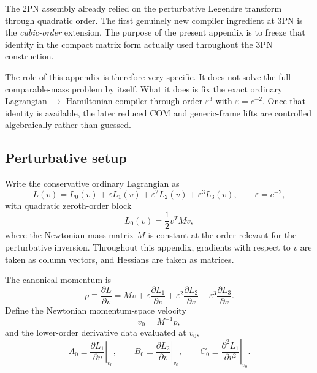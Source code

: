 \documentclass[11pt]{article}
\begin{document}
The $2$PN assembly already relied on the perturbative Legendre transform through
quadratic order.  The first genuinely new compiler ingredient at $3$PN is the
\emph{cubic-order} extension.  The purpose of the present appendix is to freeze
that identity in the compact matrix form actually used throughout the $3$PN
construction.

The role of this appendix is therefore very specific.  It does not solve the
full comparable-mass problem by itself.  What it does is fix the exact ordinary
Lagrangian $\to$ Hamiltonian compiler through order $\varepsilon^3$ with
\(\varepsilon=c^{-2}\).  Once that identity is available, the later reduced COM
and generic-frame lifts are controlled algebraically rather than guessed.

\subsection{Perturbative setup}
\label{app:cubic-legendre-setup}

Write the conservative ordinary Lagrangian as
\begin{equation}
L(v)=L_0(v)+\varepsilon L_1(v)+\varepsilon^2L_2(v)+\varepsilon^3L_3(v),
\qquad
\varepsilon=c^{-2},
\label{eq:app-cubic-legendre-L-expansion}
\end{equation}
with quadratic zeroth-order block
\begin{equation}
L_0(v)=\frac12 v^T M v,
\label{eq:app-cubic-legendre-L0}
\end{equation}
where the Newtonian mass matrix \(M\) is constant at the order relevant for the
perturbative inversion.  Throughout this appendix, gradients with respect to
\(v\) are taken as column vectors, and Hessians are taken as matrices.

The canonical momentum is
\begin{equation}
p\equiv \frac{\partial L}{\partial v}
= Mv
+\varepsilon\frac{\partial L_1}{\partial v}
+\varepsilon^2\frac{\partial L_2}{\partial v}
+\varepsilon^3\frac{\partial L_3}{\partial v}.
\label{eq:app-cubic-legendre-momentum}
\end{equation}
Define the Newtonian momentum-space velocity
\begin{equation}
v_0=M^{-1}p,
\label{eq:app-cubic-legendre-v0}
\end{equation}
and the lower-order derivative data evaluated at \(v_0\),
\begin{equation}
A_0\equiv \left.\frac{\partial L_1}{\partial v}\right|_{v_0},
\qquad
B_0\equiv \left.\frac{\partial L_2}{\partial v}\right|_{v_0},
\qquad
C_0\equiv \left.\frac{\partial^2L_1}{\partial v^2}\right|_{v_0}.
\label{eq:app-cubic-legendre-ABC}
\end{equation}
\end{document}

